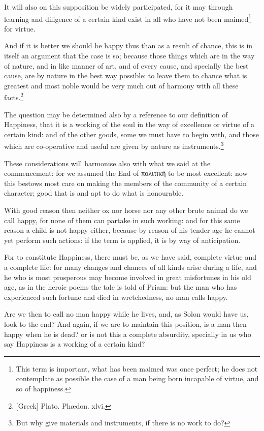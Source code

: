 It will also on this supposition be widely participated, for it may through
learning and diligence of a certain kind exist in all who have not been
maimed\footnote{This term is important, what has been maimed was once perfect; he does not
contemplate as possible the case of a man being born incapable of virtue, and
so of happiness.}
for virtue.

And if it is better we should be happy thus than as a result of chance, this is
in itself an argument that the case is so; because those things which are in
the way of nature, and in like manner of art, and of every cause, and specially
the best cause, are by nature in the best way possible: to leave them to chance
what is greatest and most noble would be very much out of harmony with all
these facts.\footnote{[Greek] Plato. Phædon. xlvi.}

The question may be determined also by a reference to our definition of
Happiness, that it is a working of the soul in the way of excellence or virtue
of a certain kind: and of the other goods, some we must have to begin with, and
those which are co-operative and useful are given by nature as
instruments.\footnote{But why give materials and instruments, if there is no work to do?}

These considerations will harmonise also with what we said at the commencement:
for we assumed the End of πολιτικὴ to
be most excellent: now this bestows most care on making the members of the
community of a certain character; good that is and apt to do what is
honourable.

With good reason then neither ox nor horse nor any other brute animal do we
call happy, for none of them can partake in such working: and for this same
reason a child is not happy either, because by reason of his tender age he
cannot yet perform such actions: if the term is applied, it is by way of
anticipation.

For to constitute Happiness, there must be, as we have said, complete virtue
and a complete life: for many changes and chances of all kinds arise during a
life, and he who is most prosperous may become involved in great misfortunes in
his old age, as in the heroic poems the tale is told of Priam: but the man who
has experienced such fortune and died in wretchedness, no man calls happy.


Are we then to call no man happy while he lives, and, as Solon would have us,
look to the end? And again, if we are to maintain this position, is a man then
happy when he is dead? or is not this a complete absurdity, specially in us who
say Happiness is a working of a certain kind?

